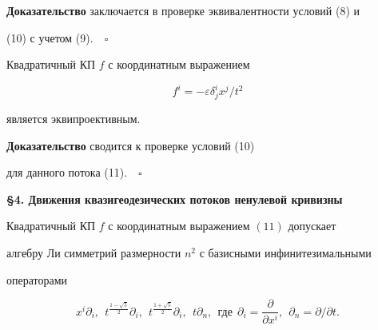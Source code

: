 {\bf Доказательство} заключается в проверке эквивалентности условий (8) и


(10) с учетом (9).$\quad\square$





\begin{lem}


Квадратичный КП $f$ с координатным выражением


\begin{equation}


f^i=-\varepsilon \delta^i_j x^j/t^2


\end{equation}


является эквипроективным.


\end{lem}





{\bf Доказательство} сводится к проверке условий (10) 


для данного потока (11).$\quad\square$


\medskip





\begin{center}


{\bf \S 4. Движения квазигеодезических потоков ненулевой кривизны}


\end{center}


\medskip








\begin{lem}


Квадратичный КП $f$ с координатным выражением $(11)$ допускает


алгебру Ли симметрий размерности $n^2$ с базисными инфинитезимальными


операторами


$$


x^i \partial_i,\ \ t^{\frac{1-\sqrt{5}}{2}}\partial_i,


\ \ t^{\frac{1+\sqrt{5}}{2}}


\partial_i,\ \ t \partial_n,\ \  \text{где}\ \ \partial_i=


\frac{\partial }{\partial x^i},


\ \ \partial_n=\partial/\partial t.


$$


\end{lem}





